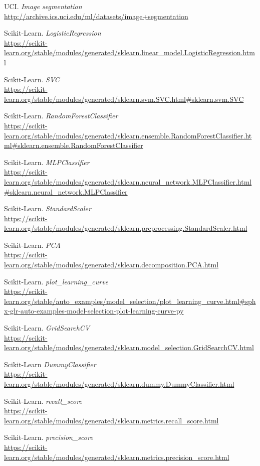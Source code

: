 \documentclass[11pt,a4paper]{article}
\begin{document}
\begin{thebibliography}{20}

UCI. \textit{Image segmentation}
\\\url{http://archive.ics.uci.edu/ml/datasets/image+segmentation}

Scikit-Learn. \textit{LogisticRegression}
\\\url{https://scikit-learn.org/stable/modules/generated/sklearn.linear_model.LogisticRegression.html}

Scikit-Learn. \textit{SVC}
\\\url{https://scikit-learn.org/stable/modules/generated/sklearn.svm.SVC.html#sklearn.svm.SVC}

Scikit-Learn. \textit{RandomForestClassifier}
\\\url{https://scikit-learn.org/stable/modules/generated/sklearn.ensemble.RandomForestClassifier.html#sklearn.ensemble.RandomForestClassifier}

Scikit-Learn. \textit{MLPClassifier}
\\\url{https://scikit-learn.org/stable/modules/generated/sklearn.neural_network.MLPClassifier.html#sklearn.neural_network.MLPClassifier}

Scikit-Learn. \textit{StandardScaler}
\\\url{https://scikit-learn.org/stable/modules/generated/sklearn.preprocessing.StandardScaler.html}

Scikit-Learn. \textit{PCA}
\\\url{https://scikit-learn.org/stable/modules/generated/sklearn.decomposition.PCA.html}

Scikit-Learn. \textit{plot\_learning\_curve}
\\\url{https://scikit-learn.org/stable/auto_examples/model_selection/plot_learning_curve.html#sphx-glr-auto-examples-model-selection-plot-learning-curve-py}

Scikit-Learn. \textit{GridSearchCV}
\\\url{https://scikit-learn.org/stable/modules/generated/sklearn.model_selection.GridSearchCV.html}

Scikit-Learn \textit{DummyClassifier}
\\\url{https://scikit-learn.org/stable/modules/generated/sklearn.dummy.DummyClassifier.html}

Scikit-Learn. \textit{recall\_score}
\\\url{https://scikit-learn.org/stable/modules/generated/sklearn.metrics.recall_score.html}

Scikit-Learn. \textit{precision\_score}
\\\url{https://scikit-learn.org/stable/modules/generated/sklearn.metrics.precision_score.html}

\end{thebibliography}
\end{document}
